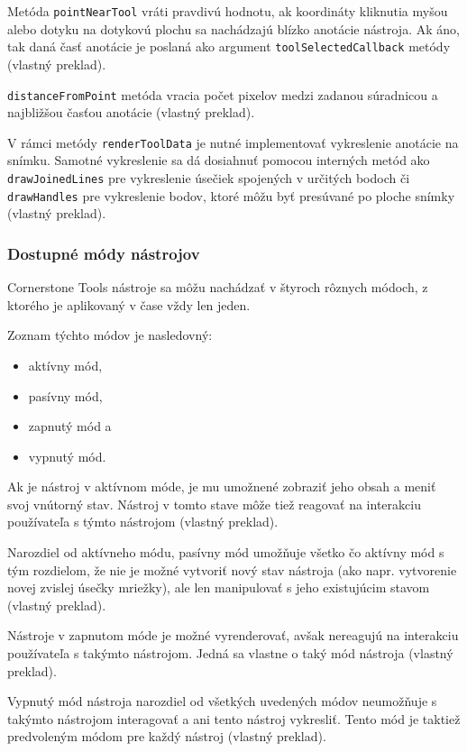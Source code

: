 Metóda \texttt{pointNearTool} vráti pravdivú hodnotu, ak koordináty kliknutia myšou alebo dotyku na dotykovú plochu sa nachádzajú blízko anotácie nástroja. Ak áno, tak daná časť anotácie je poslaná ako argument \texttt{toolSelectedCallback} metódy \cite{base_tool_description} (vlastný preklad).

\texttt{distanceFromPoint} metóda vracia počet pixelov medzi zadanou súradnicou a najbližšou časťou anotácie \cite{base_tool_description} (vlastný preklad).

V rámci metódy \texttt{renderToolData} je nutné implementovať vykreslenie anotácie na snímku. Samotné vykreslenie sa dá dosiahnuť pomocou interných metód ako \texttt{drawJoinedLines} pre vykreslenie úsečiek spojených v určitých bodoch či \texttt{drawHandles} pre vykreslenie bodov, ktoré môžu byť presúvané po ploche snímky \cite{base_tool_description} (vlastný preklad).

\subsubsection {Dostupné módy nástrojov}
Cornerstone Tools nástroje sa môžu nachádzať v štyroch rôznych módoch, z ktorého je aplikovaný v čase vždy len jeden.

Zoznam týchto módov je nasledovný:
\begin {itemize}
\item {aktívny mód,}
\item {pasívny mód,}
\item {zapnutý mód a}
\item {vypnutý mód.}
\end {itemize}

Ak je nástroj v aktívnom móde, je mu umožnené zobraziť jeho obsah a meniť svoj vnútorný stav. Nástroj v tomto stave môže tiež reagovať na interakciu používateľa s týmto nástrojom \cite{cornerstone_tools_modes} (vlastný preklad).

Narozdiel od aktívneho módu, pasívny mód umožňuje všetko čo aktívny mód s tým rozdielom, že nie je možné vytvoriť nový stav nástroja (ako napr. vytvorenie novej zvislej úsečky mriežky), ale len manipulovať s jeho existujúcim stavom \cite{cornerstone_tools_modes} (vlastný preklad).

Nástroje v zapnutom móde je možné vyrenderovať, avšak nereagujú na interakciu používateľa s takýmto nástrojom. Jedná sa vlastne o taký  mód nástroja \cite{cornerstone_tools_modes} (vlastný preklad).

Vypnutý mód nástroja narozdiel od všetkých uvedených módov neumožňuje s takýmto nástrojom interagovať a ani tento nástroj vykresliť. Tento mód je taktiež predvoleným módom pre každý nástroj \cite{cornerstone_tools_modes} (vlastný preklad).

